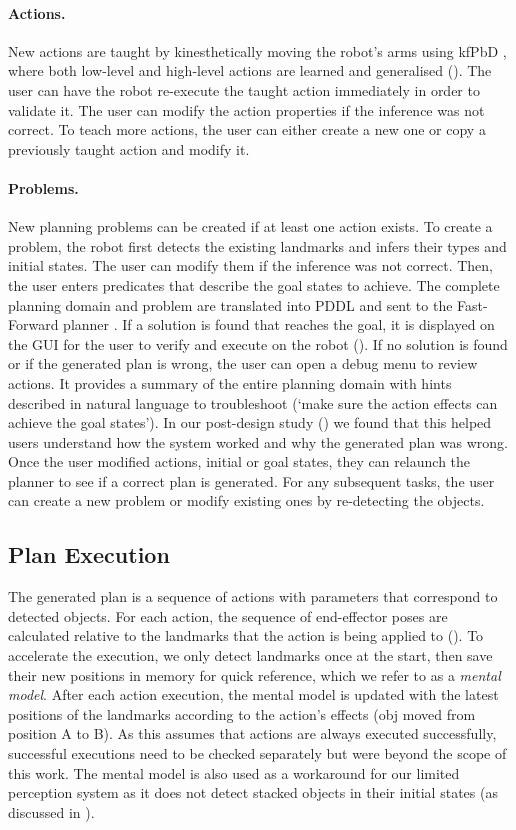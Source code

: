 \paragraph{Actions.} New actions are taught by kinesthetically moving the robot's arms using kfPbD \cite{akgun2012keyframe}, where both low-level and high-level actions are learned and generalised ().
The user can have the robot re-execute the taught action immediately in order to validate it.
The user can modify the action properties if the inference was not correct.
To teach more actions, the user can either create a new one or copy a previously taught action and modify it.

\paragraph{Problems.} New planning problems can be created if at least one action exists.
To create a problem, the robot first detects the existing landmarks and infers their types and initial states.
The user can modify them if the inference was not correct.
Then, the user enters predicates that describe the goal states to achieve.
The complete planning domain and problem are translated into PDDL and sent to the Fast-Forward planner \cite{hoffmann2001ff}.
If a solution is found that reaches the goal, it is displayed on the GUI for the user to verify and execute on the robot ().
If no solution is found or if the generated plan is wrong, the user can open a debug menu to review actions.
It provides a summary of the entire planning domain with hints described in natural language to troubleshoot (\eg `make sure the action effects can achieve the goal states').
In our post-design study () we found that this helped users understand how the system worked and why the generated plan was wrong.
Once the user modified actions, initial or goal states, they can relaunch the planner to see if a correct plan is generated.
For any subsequent tasks, the user can create a new problem or modify existing ones by re-detecting the objects.

\subsection{Plan Execution} 
The generated plan is a sequence of actions with parameters that correspond to detected objects.
For each action, the sequence of end-effector poses are calculated relative to the landmarks that the action is being applied to ().
To accelerate the execution, we only detect landmarks once at the start, then save their new positions in memory for quick reference, which we refer to as a \textit{mental model}.
After each action execution, the mental model is updated with the latest positions of the landmarks according to the action's effects (\eg obj moved from position A to B).
As this assumes that actions are always executed successfully, successful executions need to be checked separately but were beyond the scope of this work.
The mental model is also used as a workaround for our limited perception system as it does not detect stacked objects in their initial states (as discussed in ).



